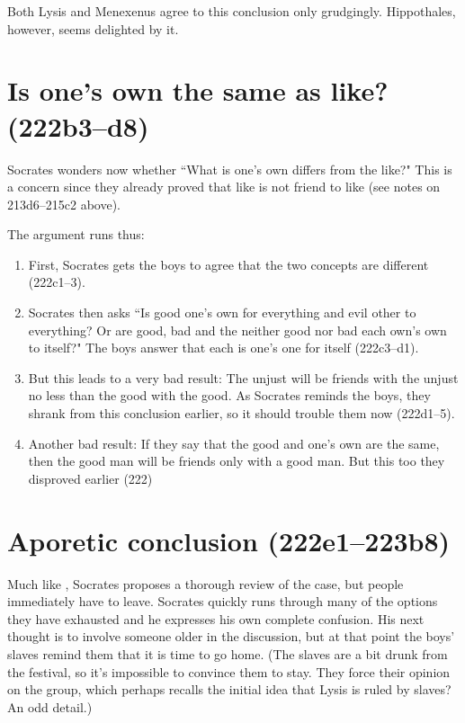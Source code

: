 \documentclass[11pt]{article}
\begin{document}
Both Lysis and Menexenus agree to this conclusion only grudgingly.
Hippothales, however, seems delighted by it.


\section{Is one's own the same as like? (222b3--d8)}

Socrates wonders now whether ``What is one's own differs from the like?"
This is a concern since they already proved that like is not friend to like
(see notes on 213d6--215c2 above).

The argument runs thus:

\begin{enumerate}

    \item First, Socrates gets the boys to agree that the two concepts are
        different (222c1--3).

    \item Socrates then asks ``Is good one's own for everything and evil
        other to everything? Or are good, bad and the neither good nor bad
        each own's own to itself?"  The boys answer that each is one's one
        for itself (222c3--d1).

    \item But this leads to a very bad result: The unjust will be friends
        with the unjust no less than the good with the good.  As Socrates
        reminds the boys, they shrank from this conclusion earlier, so it
        should trouble them now (222d1--5).

    \item Another bad result: If they say that the good and one's own are
        the same, then the good man will be friends only with a good man.
        But this too they disproved earlier (222)

\end{enumerate}


\section{Aporetic conclusion (222e1--223b8)}

Much like , Socrates proposes a thorough review of the
case, but people immediately have to leave.  Socrates quickly runs through
many of the options they have exhausted and he expresses his own complete
confusion.  His next thought is to involve someone older in the discussion,
but at that point the boys' slaves remind them that it is time to go home.
(The slaves are a bit drunk from the festival, so it's impossible to
convince them to stay.  They force their opinion on the group, which
perhaps recalls the initial idea that Lysis is ruled by slaves? An odd
detail.)
\end{document}
